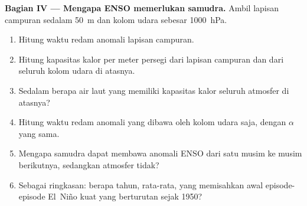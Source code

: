 \begin{problem}
\medskip\noindent\textbf{Bagian IV --- Mengapa ENSO memerlukan samudra.}
Ambil lapisan campuran sedalam \qty{50}{m} dan kolom udara sebesar \qty{1000}{hPa}.
\begin{enumerate}[resume]
  \item Hitung waktu redam anomali lapisan campuran.
  \item Hitung kapasitas kalor per meter persegi dari lapisan campuran dan dari seluruh kolom
        udara di atasnya.
  \item Sedalam berapa air laut yang memiliki kapasitas kalor seluruh atmosfer di atasnya?
  \item Hitung waktu redam anomali yang dibawa oleh kolom udara saja, dengan
        $\alpha$ yang sama.
  \item Mengapa samudra dapat membawa anomali ENSO dari satu musim ke musim berikutnya, sedangkan
        atmosfer tidak?
  \item Sebagai ringkasan: berapa tahun, rata-rata, yang memisahkan awal episode-episode El~Niño kuat
        yang berturutan sejak 1950?
\end{enumerate}
\end{problem}
